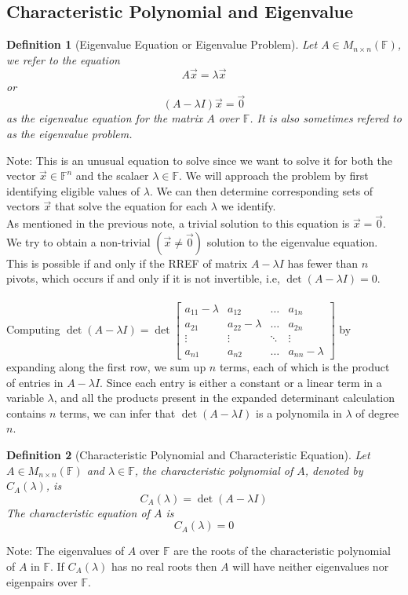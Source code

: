 \documentclass[10pt]{article}
\theoremstyle{break}
\newtheorem{defn}{Definition}[subsection]
\begin{document}
\subsection{Characteristic Polynomial and Eigenvalue}
\begin{defn}[Eigenvalue Equation or Eigenvalue Problem]
    Let $A\in M_{n \times n}(\mathbb{F})$, we refer to the equation $$A\vec{x} = \lambda \vec{x}$$
    or  $$(A - \lambda I)\vec{x} = \vec{0}$$ as the eigenvalue equation for the matrix $A$ over $\mathbb{F}$. It is also sometimes refered to as the eigenvalue problem. 
\end{defn}
Note: This is an unusual equation to solve since we want to solve it for both the vector $\vec{x} \in \mathbb{F}^n$ and the scalaer $\lambda \in \mathbb{F}$. We will approach the problem by first identifying eligible values of $\lambda $. We can then determine corresponding sets of vectors $\vec{x}$ that solve the equation for each $\lambda $ we identify. 
\\
As mentioned in the previous note, a trivial solution to this equation is $\vec{x} = \vec{0}$. We try to obtain a non-trivial $(\vec{x} \ne \vec{0})$ solution to the eigenvalue equation. This is possible if and only if the RREF of matrix $A - \lambda I$ has fewer than $n $ pivots, which occurs if and only if it is not invertible, i.e, $\det(A - \lambda I) = 0$.
\\ \; \\
Computing $\det(A - \lambda I) = \det \begin{bmatrix} a_{11} - \lambda & a_{12} & \dots & a_{1n}\\
    a_{21} & a_{22} - \lambda & \dots & a_{2n}\\
    \vdots & \vdots & \ddots & \vdots \\
    a_{n1} & a_{n2} & \dots & a_{nn} - \lambda \end{bmatrix}$ by expanding along the first row, we sum up $n $ terms, each of which is the product of entries in $A - \lambda I$. Since each entry is either a constant or a linear term in a variable $\lambda $, and all the products present in the expanded determinant calculation contains $n$ terms, we can infer that $\det(A - \lambda I)$ is a polynomila in $\lambda $ of degree $n$.

\begin{defn}[Characteristic Polynomial and Characteristic Equation]
    Let $A\in M_{n \times n}(\mathbb{F})$ and $\lambda \in \mathbb{F}$, the characteristic polynomial of $A$, denoted by $C_A(\lambda)$, is 
    $$C_A(\lambda) = \det(A - \lambda I)$$
    The characteristic equation of $A$ is $$C_A(\lambda) = 0$$
\end{defn}
Note: The eigenvalues of $A$ over $\mathbb{F}$ are the roots of the characteristic polynomial of $A$ in $\mathbb{F}$.
If $C_A(\lambda)$ has no real roots then $A $ will have neither eigenvalues nor eigenpairs over $\mathbb{F}$.
\end{document}
